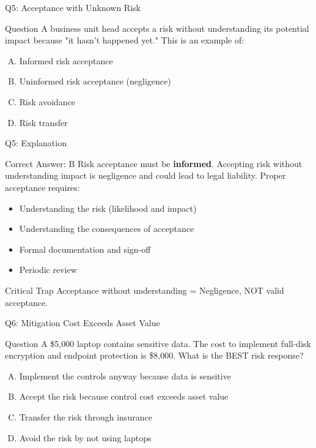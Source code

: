 \documentclass{beamer}
\begin{document}
	\begin{frame}{Q5: Acceptance with Unknown Risk}
		\begin{block}{Question}
			A business unit head accepts a risk without understanding its potential impact because "it hasn't happened yet." This is an example of:
		\end{block}
		\begin{enumerate}[(A)]
			\item Informed risk acceptance
			\item Uninformed risk acceptance (negligence)
			\item Risk avoidance
			\item Risk transfer
		\end{enumerate}
	\end{frame}
	
	\begin{frame}{Q5: Explanation}
		\begin{block}{Correct Answer: B}
			Risk acceptance must be \textbf{informed}. Accepting risk without understanding impact is negligence and could lead to legal liability. Proper acceptance requires:
			\begin{itemize}
				\item Understanding the risk (likelihood and impact)
				\item Understanding the consequences of acceptance
				\item Formal documentation and sign-off
				\item Periodic review
			\end{itemize}
		\end{block}
		\begin{alertblock}{Critical Trap}
			Acceptance without understanding = Negligence, NOT valid acceptance.
		\end{alertblock}
	\end{frame}
	
	\begin{frame}{Q6: Mitigation Cost Exceeds Asset Value}
		\begin{block}{Question}
			A \$5,000 laptop contains sensitive data. The cost to implement full-disk encryption and endpoint protection is \$8,000. What is the BEST risk response?
		\end{block}
		\begin{enumerate}[(A)]
			\item Implement the controls anyway because data is sensitive
			\item Accept the risk because control cost exceeds asset value
			\item Transfer the risk through insurance
			\item Avoid the risk by not using laptops
		\end{enumerate}
	\end{frame}
	
\end{document}
